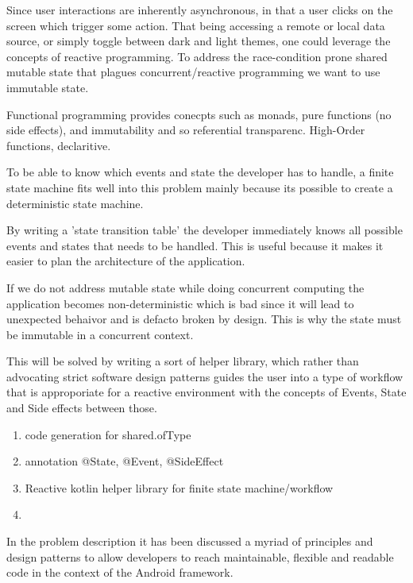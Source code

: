 Since user interactions are inherently asynchronous, in that a user clicks on the screen which trigger some action. 
That being accessing a remote or local data source, or simply toggle between dark and light themes, one could leverage the concepts of reactive programming.
To address the race-condition prone shared mutable state that plagues concurrent/reactive programming we want to use immutable state.

Functional programming provides conecpts such as monads, pure functions (no side effects), and immutability and so referential transparenc.
High-Order functions, declaritive.

To be able to know which events and state the developer has to handle, a finite state machine \cite{fsmWikiPage} fits well into 
this problem mainly because its possible to create a deterministic state machine.

By writing a 'state transition table' the developer immediately knows all possible events and states that needs to be handled.
This is useful because it makes it easier to plan the architecture of the application.

If we do not address mutable state while doing concurrent computing the application becomes non-deterministic
which is bad since it will lead to unexpected behaivor and is defacto broken by design. 
This is why the state must be immutable in a concurrent context.

This will be solved by writing a sort of helper library, which rather than advocating strict software design patterns
guides the user into a type of workflow that is approporiate for a reactive environment with the concepts
of Events, State and Side effects between those.

\begin{enumerate}

    \item code generation for shared.ofType
    \item annotation @State, @Event, @SideEffect
    \item Reactive kotlin helper library for finite state machine/workflow
    \item 

\end{enumerate}

In the problem description it has been discussed a myriad of principles and design patterns
to allow developers to reach maintainable, flexible and readable code in the context of the Android framework.

